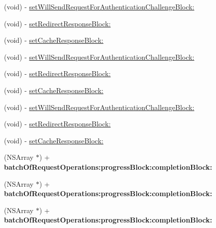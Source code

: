  \begin{DoxyCompactItemize}
\item 
(void) -\/ \mbox{\hyperlink{interface_a_f_u_r_l_connection_operation_a1b3cba1bf8db5763863c288ed04e4f31}{set\+Will\+Send\+Request\+For\+Authentication\+Challenge\+Block\+:}}
\item 
(void) -\/ \mbox{\hyperlink{interface_a_f_u_r_l_connection_operation_a844f5a93caf867e8c11dbae1cedb5e2f}{set\+Redirect\+Response\+Block\+:}}
\item 
(void) -\/ \mbox{\hyperlink{interface_a_f_u_r_l_connection_operation_a1de158a5fe7e2e45c6fc901a59870b28}{set\+Cache\+Response\+Block\+:}}
\item 
(void) -\/ \mbox{\hyperlink{interface_a_f_u_r_l_connection_operation_a1b3cba1bf8db5763863c288ed04e4f31}{set\+Will\+Send\+Request\+For\+Authentication\+Challenge\+Block\+:}}
\item 
(void) -\/ \mbox{\hyperlink{interface_a_f_u_r_l_connection_operation_a844f5a93caf867e8c11dbae1cedb5e2f}{set\+Redirect\+Response\+Block\+:}}
\item 
(void) -\/ \mbox{\hyperlink{interface_a_f_u_r_l_connection_operation_a1de158a5fe7e2e45c6fc901a59870b28}{set\+Cache\+Response\+Block\+:}}
\item 
(void) -\/ \mbox{\hyperlink{interface_a_f_u_r_l_connection_operation_a1b3cba1bf8db5763863c288ed04e4f31}{set\+Will\+Send\+Request\+For\+Authentication\+Challenge\+Block\+:}}
\item 
(void) -\/ \mbox{\hyperlink{interface_a_f_u_r_l_connection_operation_a844f5a93caf867e8c11dbae1cedb5e2f}{set\+Redirect\+Response\+Block\+:}}
\item 
(void) -\/ \mbox{\hyperlink{interface_a_f_u_r_l_connection_operation_a1de158a5fe7e2e45c6fc901a59870b28}{set\+Cache\+Response\+Block\+:}}
\item 
\mbox{\label{interface_a_f_u_r_l_connection_operation_aaaa9d9f6d010b27128d1e3936c547b1e}} 
(N\+S\+Array $\ast$) + {\bfseries batch\+Of\+Request\+Operations\+:progress\+Block\+:completion\+Block\+:}
\item 
\mbox{\label{interface_a_f_u_r_l_connection_operation_aaaa9d9f6d010b27128d1e3936c547b1e}} 
(N\+S\+Array $\ast$) + {\bfseries batch\+Of\+Request\+Operations\+:progress\+Block\+:completion\+Block\+:}
\item 
\mbox{\label{interface_a_f_u_r_l_connection_operation_aaaa9d9f6d010b27128d1e3936c547b1e}} 
(N\+S\+Array $\ast$) + {\bfseries batch\+Of\+Request\+Operations\+:progress\+Block\+:completion\+Block\+:}
\end{DoxyCompactItemize}


